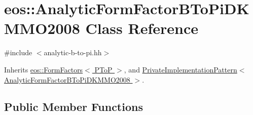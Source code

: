 \hypertarget{classeos_1_1AnalyticFormFactorBToPiDKMMO2008}{
\section{eos::AnalyticFormFactorBToPiDKMMO2008 Class Reference}
\label{classeos_1_1AnalyticFormFactorBToPiDKMMO2008}
}


{\ttfamily \#include $<$analytic-\/b-\/to-\/pi.hh$>$}

Inherits \hyperlink{classeos_1_1FormFactors_3_01PToP_01_4}{eos::FormFactors$<$ PToP $>$}, and \hyperlink{classeos_1_1PrivateImplementationPattern}{PrivateImplementationPattern$<$ AnalyticFormFactorBToPiDKMMO2008 $>$}.\subsection*{Public Member Functions}
